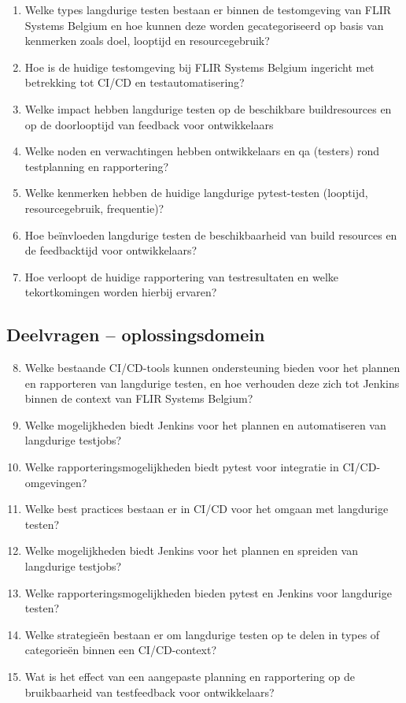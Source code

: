 {\color{red}
\begin{enumerate}
  \item Welke types langdurige testen bestaan er binnen de testomgeving van FLIR Systems Belgium en hoe kunnen deze worden gecategoriseerd op basis van kenmerken zoals doel, looptijd en resourcegebruik?
  \item Hoe is de huidige testomgeving bij FLIR Systems Belgium ingericht met betrekking tot CI/CD en testautomatisering?
  \item Welke impact hebben langdurige testen op de beschikbare buildresources en op de doorlooptijd van feedback voor ontwikkelaars
  \item Welke noden en verwachtingen hebben ontwikkelaars en qa (testers) rond testplanning en rapportering?
  \item Welke kenmerken hebben de huidige langdurige pytest-testen (looptijd, resourcegebruik, frequentie)?
  \item Hoe beïnvloeden langdurige testen de beschikbaarheid van build resources en de feedbacktijd voor ontwikkelaars?
  \item Hoe verloopt de huidige rapportering van testresultaten en welke tekortkomingen worden hierbij ervaren?
\end{enumerate}
}

\subsection*{Deelvragen – oplossingsdomein}

{\color{red}
\begin{enumerate}
  \setcounter{enumi}{7}
  \item Welke bestaande CI/CD-tools kunnen ondersteuning bieden voor het plannen en rapporteren van langdurige testen, en hoe verhouden deze zich tot Jenkins binnen de context van FLIR Systems Belgium?
  \item Welke mogelijkheden biedt Jenkins voor het plannen en automatiseren van langdurige testjobs?
  \item Welke rapporteringsmogelijkheden biedt pytest voor integratie in CI/CD-omgevingen?
  \item Welke best practices bestaan er in CI/CD voor het omgaan met langdurige testen?
  \item Welke mogelijkheden biedt Jenkins voor het plannen en spreiden van langdurige testjobs?
  \item Welke rapporteringsmogelijkheden bieden pytest en Jenkins voor langdurige testen?
  \item Welke strategieën bestaan er om langdurige testen op te delen in types of categorieën binnen een CI/CD-context?
  \item Wat is het effect van een aangepaste planning en rapportering op de bruikbaarheid van testfeedback voor ontwikkelaars?
\end{enumerate}
}

